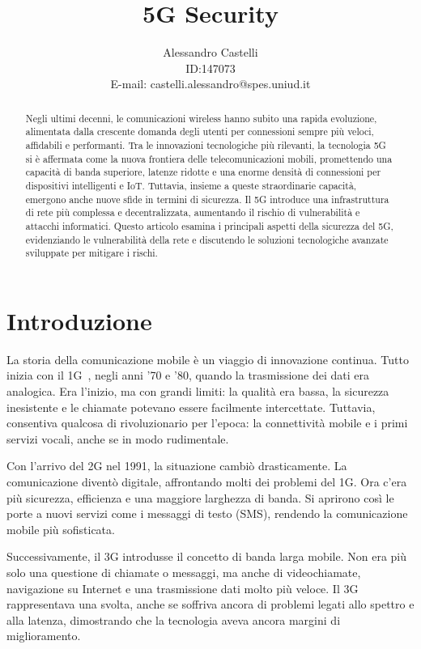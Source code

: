 \documentclass[english]{article}
\title{5G Security}
\author{Alessandro Castelli \\ ID:\@147073 \\ E-mail: castelli.alessandro@spes.uniud.it}
\begin{document}
\begin{abstract}
	Negli ultimi decenni, le comunicazioni wireless hanno subito una rapida
	evoluzione, alimentata dalla crescente domanda degli utenti per connessioni
	sempre più veloci, affidabili e performanti. Tra le innovazioni tecnologiche
	più rilevanti, la tecnologia 5G si è affermata come la nuova frontiera delle
	telecomunicazioni mobili, promettendo una capacità di banda superiore,
	latenze ridotte e una enorme densità di connessioni per dispositivi
	intelligenti e IoT. Tuttavia, insieme a queste straordinarie capacità,
	emergono anche nuove sfide in termini di sicurezza. Il 5G introduce una
	infrastruttura di rete più complessa e decentralizzata, aumentando il rischio
	di vulnerabilità e attacchi informatici. Questo articolo esamina i principali
	aspetti della sicurezza del 5G, evidenziando le vulnerabilità della rete e
	discutendo le soluzioni tecnologiche avanzate sviluppate per mitigare i rischi.
\end{abstract}

\clearpage

\tableofcontents
\newpage
\section{Introduzione}

La storia della comunicazione mobile è un viaggio di innovazione continua.
Tutto inizia con il 1G~\cite{dangi2021study}, negli anni '70 e '80, quando la
trasmissione dei dati era analogica. Era l'inizio, ma con grandi limiti: la
qualità era bassa, la sicurezza inesistente e le chiamate potevano essere
facilmente intercettate. Tuttavia, consentiva qualcosa di rivoluzionario per
l'epoca: la connettività mobile e i primi servizi vocali, anche se in modo
rudimentale.

Con l'arrivo del 2G nel 1991, la situazione cambiò drasticamente. La
comunicazione diventò digitale, affrontando molti dei problemi del 1G. Ora
c'era più sicurezza, efficienza e una maggiore larghezza di banda. Si aprirono
così le porte a nuovi servizi come i messaggi di testo (SMS), rendendo la
comunicazione mobile più sofisticata.

Successivamente, il 3G introdusse il concetto di banda larga mobile. Non era
più solo una questione di chiamate o messaggi, ma anche di videochiamate,
navigazione su Internet e una trasmissione dati molto più veloce. Il 3G
rappresentava una svolta, anche se soffriva ancora di problemi legati allo
spettro e alla latenza, dimostrando che la tecnologia aveva ancora margini di
miglioramento.
\end{document}
